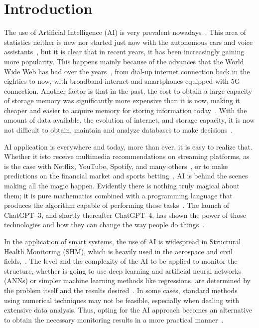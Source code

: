 \chapter{Introduction}

The use of Artificial Intelligence (AI) is very prevalent nowadays~\cite{lee2020,poola2017,rabunal2006}. 
This area of statistics neither is new nor started just now with the autonomous cars and voice assistants~\cite{muthukrishnan2020}, but it is clear that in recent years, it has been increasingly gaining more popularity. 
This happens mainly because of the advances that the World Wide Web has had over the years~\cite{leiner2009,cohen-almagor2011}, from dial-up internet connection back in the eighties to now, with broadband internet and smartphones equipped with 5G connection. 
Another factor is that in the past, the cost to obtain a large capacity of storage memory was significantly more expensive than it is now, making it cheaper and easier to acquire memory for storing information today~\cite{goda2012}. 
With the amount of data available, the evolution of internet, and storage capacity, it is now not difficult to obtain, maintain and analyze databases to make decisions~\cite{duan2019}.

AI application is everywhere and today, more than ever, it is easy to realize that. 
Whether it isto receive multimedia recommendations on streaming platforms, as is the case with Netflix, YouTube, Spotify, and many others~\cite{chan-olmsted2019}, or to make predictions on the financial market and sports betting~\cite{milana2021,kollar2021,hubacek2019}, AI is behind the scenes making all the magic happen. 
Evidently there is nothing truly magical about them; it is pure mathematics combined with a programming language that produces the algorithm capable of performing these tasks~\cite{goodfellow2016,aurelien2022,raschka2015,raschka2022}.
The launch of ChatGPT--3, and shortly thereafter ChatGPT--4, has shown the power of those technologies and how they can change the way people do things~\cite{biswas2023,biswas2023a, lund2023,baidoo-anu2023}.

In the application of smart systems, the use of AI is widespread in Structural Health Monitoring (SHM), which is heavily used in the aerospace and civil fields,~\cite{azimi2020,ye2019}. 
The level and the complexity of the AI to be applied to monitor the structure, whether is going to use deep learning and artificial neural networks (ANNs) or simpler machine learning methods like regressions, are determined by the problem itself and the results desired~\cite{farrar2012}. 
In some cases, standard methods using numerical techniques may not be feasible, especially when dealing with extensive data analysis. 
Thus, opting for the AI approach becomes an alternative to obtain the necessary monitoring results in a more practical manner~\cite{smarsly2007,sun2020}. 

